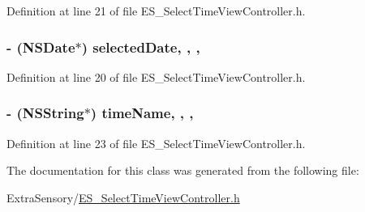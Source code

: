 Definition at line 21 of file E\+S\+\_\+\+Select\+Time\+View\+Controller.\+h.

\hypertarget{interface_e_s___select_time_view_controller_af83b6b915cc28e012817a562119950c3}{
\subsubsection[{selected\+Date}]{\setlength{\rightskip}{0pt plus 5cm}-\/ (N\+S\+Date$\ast$) selected\+Date\hspace{0.3cm}{\ttfamily [read]}, {\ttfamily [write]}, {\ttfamily [nonatomic]}, {\ttfamily [assign]}}}\label{interface_e_s___select_time_view_controller_af83b6b915cc28e012817a562119950c3}


Definition at line 20 of file E\+S\+\_\+\+Select\+Time\+View\+Controller.\+h.

\hypertarget{interface_e_s___select_time_view_controller_ae461c461e29e5155f14d4f0c88e9b907}{
\subsubsection[{time\+Name}]{\setlength{\rightskip}{0pt plus 5cm}-\/ (N\+S\+String$\ast$) time\+Name\hspace{0.3cm}{\ttfamily [read]}, {\ttfamily [write]}, {\ttfamily [nonatomic]}, {\ttfamily [assign]}}}\label{interface_e_s___select_time_view_controller_ae461c461e29e5155f14d4f0c88e9b907}


Definition at line 23 of file E\+S\+\_\+\+Select\+Time\+View\+Controller.\+h.



The documentation for this class was generated from the following file\+:\begin{DoxyCompactItemize}
\item 
Extra\+Sensory/\hyperlink{_e_s___select_time_view_controller_8h}{E\+S\+\_\+\+Select\+Time\+View\+Controller.\+h}\end{DoxyCompactItemize}
